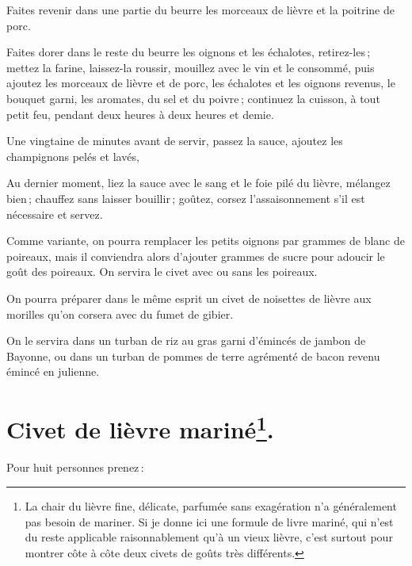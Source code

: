 Faites revenir dans une partie du beurre les morceaux de lièvre et la poitrine
de porc.

Faites dorer dans le reste du beurre les oignons et les échalotes,
retirez-les ; mettez la farine, laissez-la roussir, mouillez avec le vin et le
consommé, puis ajoutez les morceaux de lièvre et de porc, les échalotes et les
oignons revenus, le bouquet garni, les aromates, du sel et du poivre ; continuez
la cuisson, à tout petit feu, pendant deux heures à deux heures et demie.

Une vingtaine de minutes avant de servir, passez la sauce, ajoutez les
champignons pelés et lavés,

Au dernier moment, liez la sauce avec le sang et le foie pilé du lièvre,
mélangez bien ; chauffez sans laisser bouillir ; goûtez, corsez
l’assaisonnement s'il est nécessaire et servez.

\sk

Comme variante, on pourra remplacer les {\mmm} petits oignons par
{\mmm} grammes de blanc de poireaux, mais il conviendra alors d'ajouter
{\mmm} grammes de sucre pour adoucir le goût des poireaux. On servira le
civet avec ou sans les poireaux.

\sk

On pourra préparer dans le même esprit un civet de noisettes de lièvre aux
morilles qu'on corsera avec du fumet de gibier.

On le servira dans un turban de riz au gras garni d'émincés de jambon de
Bayonne, ou dans un turban de pommes de terre agrémenté de bacon revenu émincé
en julienne.

\section*{\centering Civet de lièvre mariné\footnote{ La chair du lièvre fine,
délicate, parfumée sans exagération n'a généralement pas besoin de mariner. Si
je donne ici une formule de livre mariné, qui n'est du reste applicable
raisonnablement qu'à un vieux lièvre, c'est surtout pour montrer côte à côte
deux civets de goûts très différents.}.}
{}

Pour huit personnes prenez :

